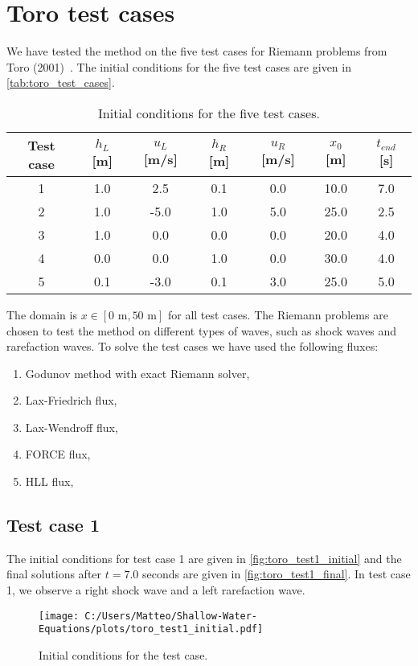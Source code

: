 \section{Toro test cases}
We have tested the method on the five test cases for Riemann problems from Toro (2001)~\cite{Toro2001-Shock}.
The initial conditions for the five test cases are given in \autoref{tab:toro_test_cases}.
\begin{table}[H]
    \centering
    \begin{tabular}{c|c|c|c|c|c|c}
        \hline
        \textbf{Test case} & \textbf{$h_L$} [m] & \textbf{$u_L$} [m/s] & \textbf{$h_R$} [m] & \textbf{$u_R$} [m/s] & \textbf{$x_0$} [m] & \textbf{$t_{end}$} [s] \\
        \hline\hline
        1 & 1.0 & 2.5 & 0.1 & 0.0 & 10.0 & 7.0 \\
        2 & 1.0 & -5.0 & 1.0 & 5.0 & 25.0 & 2.5 \\
        3 & 1.0 & 0.0 & 0.0 & 0.0 & 20.0 & 4.0 \\
        4 & 0.0 & 0.0 & 1.0 & 0.0 & 30.0 & 4.0 \\
        5 & 0.1 & -3.0 & 0.1 & 3.0 & 25.0 & 5.0 \\
        \hline
    \end{tabular}
    \caption{Initial conditions for the five test cases.}\label{tab:toro_test_cases}
\end{table}
The domain is $x \in [0 \text{ m}, 50 \text{ m}]$ for all test cases.
The Riemann problems are chosen to test the method on different types of waves, such as shock waves and rarefaction waves.
To solve the test cases we have used the following fluxes:
\begin{enumerate}
    \item Godunov method with exact Riemann solver,
    \item Lax-Friedrich flux,
    \item Lax-Wendroff flux,
    \item FORCE flux,
    \item HLL flux,
\end{enumerate}

\subsection*{Test case 1}
The initial conditions for test case 1 are given in \autoref{fig:toro_test1_initial} and the final solutions after $t=7.0$ seconds are given in \autoref{fig:toro_test1_final}.
In test case 1, we observe a right shock wave and a left rarefaction wave.
\begin{figure}[H]
    \centering
    \texttt{[image: C:/Users/Matteo/Shallow-Water-Equations/plots/toro\_test1\_initial.pdf]}
    \caption{Initial conditions for the test case.}\label{fig:toro_test1_initial}
\end{figure}


